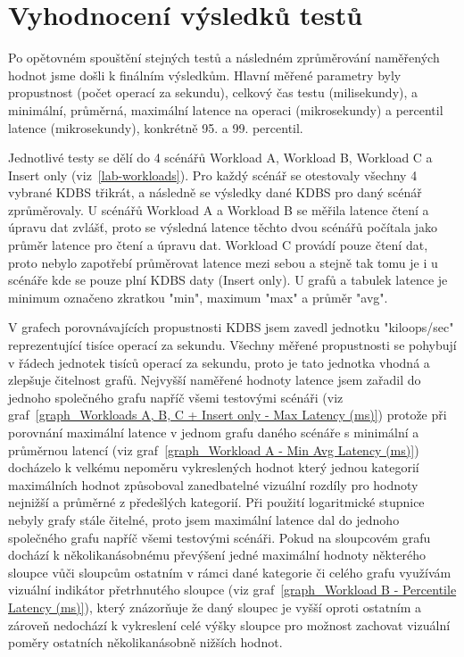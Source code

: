 \documentclass[czech,master,dept460,male,csharp,cpdeclaration]{diploma}
\begin{document}
	\section{Vyhodnocení výsledků testů}
	
	Po opětovném spouštění stejných testů a následném zprůměrování naměřených hodnot jsme došli k finálním výsledkům. Hlavní měřené parametry byly propustnost (počet operací za sekundu), celkový čas testu (milisekundy), a minimální, průměrná, maximální latence na operaci (mikrosekundy) a percentil latence (mikrosekundy), konkrétně 95. a 99. percentil.
	
	Jednotlivé testy se dělí do 4 scénářů Workload A, Workload B, Workload C a Insert only (viz~\ref{lab-workloads}). Pro každý scénář se otestovaly všechny 4 vybrané KDBS třikrát, a následně se výsledky dané KDBS pro daný scénář zprůměrovaly. U scénářů Workload A a Workload B se měřila latence čtení a úpravu dat zvlášť, proto se výsledná latence těchto dvou scénářů počítala jako průměr latence pro čtení a úpravu dat. Workload C provádí pouze čtení dat, proto nebylo zapotřebí průměrovat latence mezi sebou a stejně tak tomu je i u scénáře kde se pouze plní KDBS daty (Insert only). U grafů a tabulek latence je minimum označeno zkratkou "min", maximum "max" a průměr "avg".
	
	V grafech porovnávajících propustnosti KDBS jsem zavedl jednotku "kiloops/sec" reprezentující tisíce operací za sekundu. Všechny měřené propustnosti se pohybují v řádech jednotek tisíců operací za sekundu, proto je tato jednotka vhodná a zlepšuje čitelnost grafů. Nejvyšší naměřené hodnoty latence jsem zařadil do jednoho společného grafu napříč všemi testovými scénáři (viz graf~\ref{graph_Workloads A, B, C + Insert only - Max Latency (ms)}) protože při porovnání maximální latence v jednom grafu daného scénáře s minimální a průměrnou latencí (viz graf~\ref{graph_Workload A - Min Avg Latency (ms)}) docházelo k velkému nepoměru vykreslených hodnot který jednou kategorií maximálních hodnot způsoboval zanedbatelné vizuální rozdíly pro hodnoty nejnižší a průměrné z předešlých kategorií. Při použití logaritmické stupnice nebyly grafy stále čitelné, proto jsem maximální latence dal do jednoho společného grafu napříč všemi testovými scénáři. Pokud na sloupcovém grafu dochází k několikanásobnému převýšení jedné maximální hodnoty některého sloupce vůči sloupcům ostatním v rámci dané kategorie či celého grafu využívám vizuální indikátor přetrhnutého sloupce (viz graf~\ref{graph_Workload B - Percentile Latency (ms)}), který znázorňuje že daný sloupec je vyšší oproti ostatním a zároveň nedochází k vykreslení celé výšky sloupce pro možnost zachovat vizuální poměry ostatních několikanásobně nižších hodnot.
	
\end{document}
